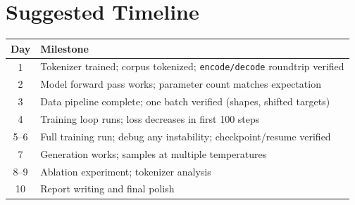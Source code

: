 \section*{Suggested Timeline}

\begin{center}
\begin{tabular}{cl}
\toprule
\textbf{Day} & \textbf{Milestone} \\
\midrule
1 & Tokenizer trained; corpus tokenized; \texttt{encode/decode} roundtrip verified \\
2 & Model forward pass works; parameter count matches expectation \\
3 & Data pipeline complete; one batch verified (shapes, shifted targets) \\
4 & Training loop runs; loss decreases in first 100 steps \\
5--6 & Full training run; debug any instability; checkpoint/resume verified \\
7 & Generation works; samples at multiple temperatures \\
8--9 & Ablation experiment; tokenizer analysis \\
10 & Report writing and final polish \\
\bottomrule
\end{tabular}
\end{center}

\bigskip

\begin{center}
\end{center}
